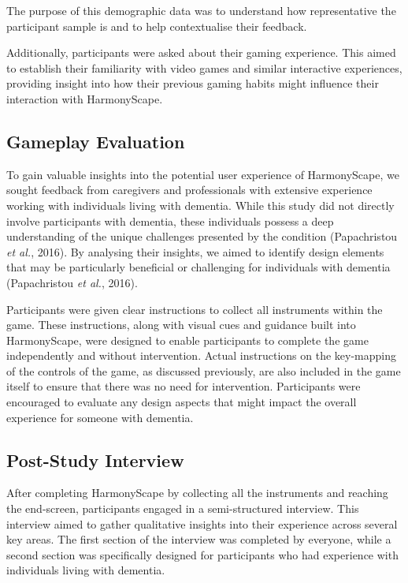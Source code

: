 \documentclass{l4proj}
\begin{document}
The purpose of this demographic data was to understand how representative the participant sample is and to help contextualise their feedback.

Additionally, participants were asked about their gaming experience. This aimed to establish their familiarity with video games and similar interactive experiences, providing insight into how their previous gaming habits might influence their interaction with HarmonyScape.

\subsection{Gameplay Evaluation}

To gain valuable insights into the potential user experience of HarmonyScape, we sought feedback from caregivers and professionals with extensive experience working with individuals living with dementia. While this study did not directly involve participants with dementia, these individuals possess a deep understanding of the unique challenges presented by the condition (Papachristou \emph{et al.}, 2016). By analysing their insights, we aimed to identify design elements that may be particularly beneficial or challenging for individuals with dementia (Papachristou \emph{et al.}, 2016).

Participants were given clear instructions to collect all instruments within the game. These instructions, along with visual cues and guidance built into HarmonyScape, were designed to enable participants to complete the game independently and without intervention. Actual instructions on the key-mapping of the controls of the game, as discussed previously, are also included in the game itself to ensure that there was no need for intervention. Participants were encouraged to evaluate any design aspects that might impact the overall experience for someone with dementia.

\subsection{Post-Study Interview}
After completing HarmonyScape by collecting all the instruments and reaching the end-screen, participants engaged in a semi-structured interview. This interview aimed to gather qualitative insights into their experience across several key areas.  The first section of the interview was completed by everyone, while a second section was specifically designed for participants who had experience with individuals living with dementia.
\end{document}
